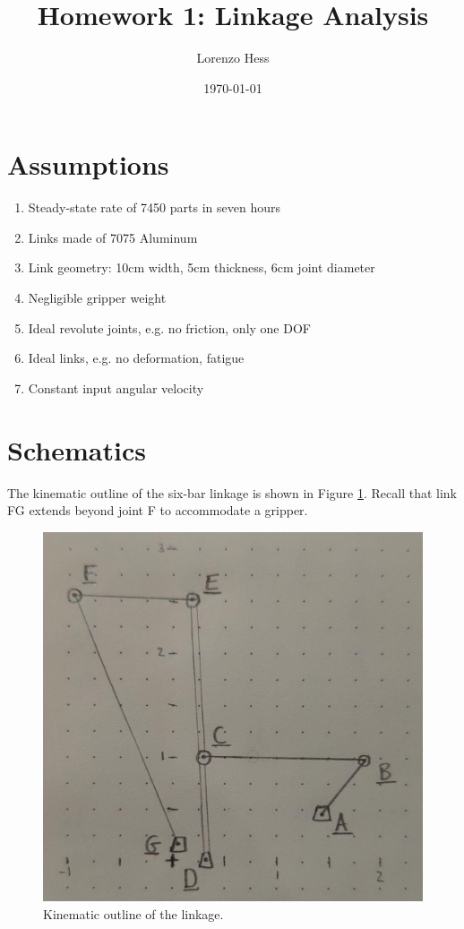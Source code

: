 \documentclass[12pt]{article}
\author{Lorenzo Hess}
\date{\today}
\title{Homework 1: Linkage Analysis}
\let\oldToC\tableofcontents
\renewcommand{\tableofcontents}{\begin{singlespace}\oldToC\end{singlespace}}
\begin{document}
\maketitle
\tableofcontents

\newpage
\section{Assumptions}%
\label{assum}

\begin{enumerate}
  \item Steady-state rate of 7450 parts in seven hours
  \item Links made of 7075 Aluminum
  \item Link geometry: 10cm width, 5cm thickness, 6cm joint diameter
  \item Negligible gripper weight
  \item Ideal revolute joints, e.g. no friction, only one DOF
  \item Ideal links, e.g. no deformation, fatigue
  \item Constant input angular velocity
\end{enumerate}

\section{Schematics}%
\label{schematics}

The kinematic outline of the six-bar linkage is shown in Figure \ref{fig:kin-outline}. Recall that link FG extends beyond joint F to accommodate a gripper.

\begin{figure}[H]
  \centering
  \includegraphics[scale=0.25]{../kinematic-outline.jpeg}
  \caption{\label{fig:kin-outline}Kinematic outline of the linkage.}
\end{figure}
\end{document}
